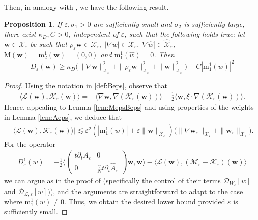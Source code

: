 \documentclass[11pt,reqno,a4paper]{amsart}
\def\eps{\varepsilon}
\def\de{{\partial}}
\newcommand{\cD}{\mathcal{D}}
\newcommand{\cK}{\mathcal{K}}
\newcommand{\cL}{\mathcal{L}}
\newcommand{\cM}{\mathcal{M}}
\newcommand{\cX}{\mathcal{X}}
\newcommand{\mrm}{\mathrm{m}}
\newcommand{\mrM}{\mathrm{M}}
\newcommand{\1}{\mathbbm{1}}
\newtheorem{proposition}{Proposition}[section]
\theoremstyle{definition}
\theoremstyle{definition}
\numberwithin{equation}{section}
\begin{document}
Then, in analogy with \cite[Proposition 4.13]{dolce2024long}, we have the following result.
\begin{proposition}
\label{prop:D}
If $\eps,\sigma_1>0$ are sufficiently small and $\sigma_2$ is sufficiently large, there exist $\kappa_D,C>0$, independent of $\eps$, such that the following holds true: let ${\mathbf w} \in \boldsymbol{\cX}_\eps$ be such that $\rho_\eps {\mathbf w} \in \boldsymbol{\cX}_\eps$, $|\nabla w|\in \cX_{\eps}, |\nabla\widehat{w}|\in \widehat{\cX}_\eps$, $\mrM({\mathbf w})=\mrm^1_2({\mathbf w})=(0,0)$ and $\mrm^1_1(\widehat{w})=0$. Then
\begin{equation}
\label{bd:Dlow}
D_{\eps}({\mathbf w})\geq \kappa_D\big(\|\nabla {\mathbf w}\|^2_{\boldsymbol{\cX}_\eps}+\|\rho_\eps {\mathbf w}\|^2_{\boldsymbol{\cX}_\eps}+\| {\mathbf w}\|^2_{\boldsymbol{\cX}_\eps}\big)-C|\mrm^1_1(w)|^2
\end{equation}
\end{proposition}
\begin{proof}
Using the notation in \cref{def:Beps}, observe that 
\begin{align}
    \langle \cL(\boldsymbol{w}),\cK_{\eps}(\boldsymbol{w})\rangle=-\langle \nabla\boldsymbol{w},\nabla(\cK_{\eps}(\boldsymbol{w}))\rangle-\frac12\langle \boldsymbol{w},\xi\cdot \nabla (\cK_{\eps}(\boldsymbol{w}))\rangle.
\end{align}
Hence, appealing to Lemma \ref{lem:MepsBeps} and using properties of the weights in  Lemma \ref{lem:Aeps}, we deduce that
\begin{align}
     |\langle \cL(\boldsymbol{w}),\cK_{\eps}(\boldsymbol{w})\rangle|\lesssim \eps^2(|\mrm_1^1(w)|+\eps\|\mathbf{w}\|_{\boldsymbol{\cX}_\eps})\big(\|\nabla {\mathbf w}_\eps\|_{\boldsymbol{\cX}_\eps}+\| {\mathbf w}_\eps\|_{\boldsymbol{\cX}_\eps}\big).
\end{align}
For the operator 
\begin{align}
    D_\eps^1(w)=  -\frac12\Big\langle \begin{pmatrix}
         t\de_t A_\eps & 0\\
         0 &\frac{\gamma}{N}t\de_t \widehat{A}_\eps
     \end{pmatrix}{\mathbf w},{\mathbf w}\Big\rangle-\langle \cL({\mathbf w}),(\cM_{\eps}-\cK_\eps)({\mathbf w})\rangle
\end{align}
we can argue as in the proof of \cite[Proposition 4.13]{dolce2024long} (specifically the control of their terms $\cD_{W_\eps}[w]$ and $\cD_{\cL,\eps}[w])$), and the arguments are  straightforward to adapt to the case where $\mrm_1^1(w)\neq0$. Thus, we obtain the desired lower bound provided $\eps$ is sufficiently small.
\end{proof}
\end{document}
